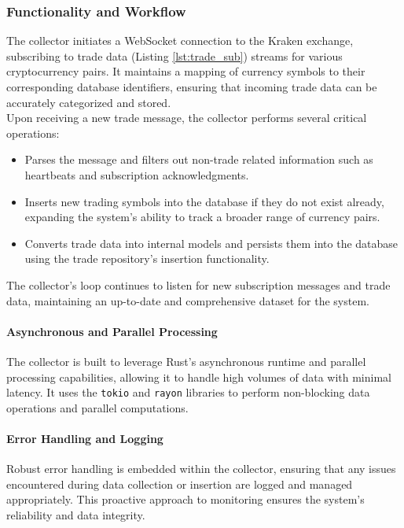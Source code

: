 \subsubsection{Functionality and Workflow}
The collector initiates a WebSocket connection to the Kraken exchange, subscribing to trade data (Listing \ref{lst:trade_sub}) streams for various cryptocurrency pairs. It maintains a mapping of currency symbols to their corresponding database identifiers, ensuring that incoming trade data can be accurately categorized and stored. \\

Upon receiving a new trade message, the collector performs several critical operations:
\begin{itemize}
    \item Parses the message and filters out non-trade related information such as heartbeats and subscription acknowledgments.
    \item Inserts new trading symbols into the database if they do not exist already, expanding the system's ability to track a broader range of currency pairs.
    \item Converts trade data into internal models and persists them into the database using the trade repository's insertion functionality.
\end{itemize}

The collector's loop continues to listen for new subscription messages and trade data, maintaining an up-to-date and comprehensive dataset for the system.

\paragraph{Asynchronous and Parallel Processing}
The collector is built to leverage Rust's asynchronous runtime and parallel processing capabilities, allowing it to handle high volumes of data with minimal latency. It uses the \texttt{tokio} and \texttt{rayon} libraries to perform non-blocking data operations and parallel computations.

\paragraph{Error Handling and Logging}
Robust error handling is embedded within the collector, ensuring that any issues encountered during data collection or insertion are logged and managed appropriately. This proactive approach to monitoring ensures the system's reliability and data integrity.

